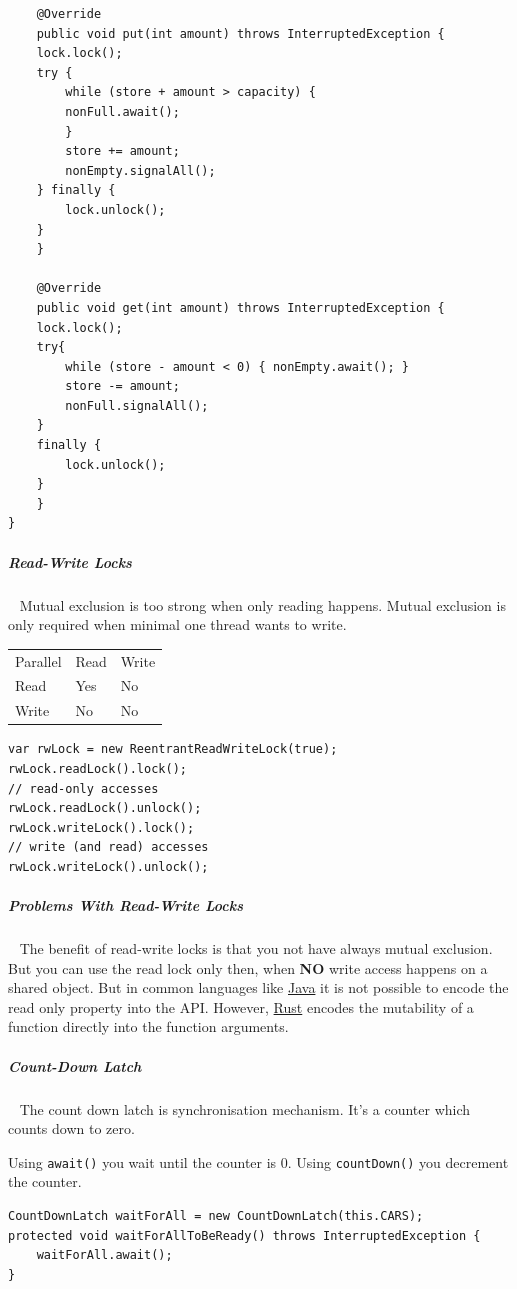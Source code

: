 \documentclass[11pt,twoside,landscape]{article}
\begin{document}
\begin{multicols}{3}
\begin{lstlisting}
    @Override
    public void put(int amount) throws InterruptedException {
	lock.lock();
	try {
	    while (store + amount > capacity) {
		nonFull.await();
	    }
	    store += amount;
	    nonEmpty.signalAll();
	} finally {
	    lock.unlock();
	}
    }

    @Override
    public void get(int amount) throws InterruptedException {
	lock.lock();
	try{
	    while (store - amount < 0) { nonEmpty.await(); }
	    store -= amount;
	    nonFull.signalAll();
	}
	finally {
	    lock.unlock();
	}
    }
}
\end{lstlisting}

\subparagraph{Read-Write Locks} \
\label{sec:orgb53f82b}
Mutual exclusion is too strong when only reading happens.
Mutual exclusion is only required when minimal one thread wants to write.

\begin{center}
\begin{tabular}{lll}
Parallel & Read & Write\\
Read & Yes & No\\
Write & No & No\\
\end{tabular}
\end{center}


\lstset{language=java,label= ,caption= ,captionpos=b,numbers=none}
\begin{lstlisting}
var rwLock = new ReentrantReadWriteLock(true);
rwLock.readLock().lock();
// read-only accesses
rwLock.readLock().unlock();
rwLock.writeLock().lock();
// write (and read) accesses
rwLock.writeLock().unlock();
\end{lstlisting}
\subparagraph{Problems With Read-Write Locks} \
\label{sec:orgba914d1}
The benefit of read-write locks is that you not have always mutual exclusion.
But you can use the read lock only then, when \textbf{NO} write access happens on a shared object.
But in common languages like \href{../../../roam/20201116150053-java.org}{Java} it is not possible to encode the read only property into the API.
However, \href{../../../roam/20200904153952-rust.org}{Rust} encodes the mutability of a function directly into the function arguments.
\subparagraph{Count-Down Latch} \
\label{sec:org010809a}
The count down latch is synchronisation mechanism.
It's a counter which counts down to zero.

Using \texttt{await()} you wait until the counter is 0.
Using \texttt{countDown()} you decrement the counter.

\lstset{language=java,label= ,caption= ,captionpos=b,numbers=none}
\begin{lstlisting}
CountDownLatch waitForAll = new CountDownLatch(this.CARS);
protected void waitForAllToBeReady() throws InterruptedException {
    waitForAll.await();
}


\end{lstlisting}
\end{multicols}
\end{document}
